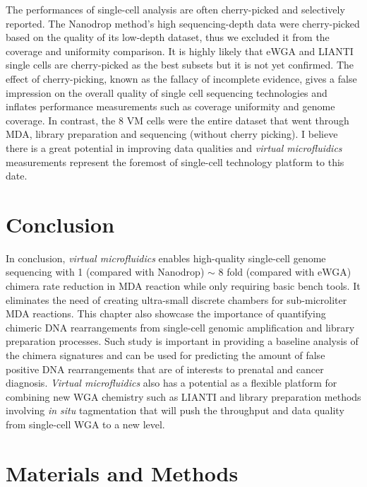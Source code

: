 The performances of single-cell analysis are often cherry-picked and selectively reported. The Nanodrop method's high sequencing-depth data were cherry-picked based on the quality of its low-depth dataset, thus we excluded it from the coverage and uniformity comparison. It is highly likely that eWGA and LIANTI single cells are cherry-picked as the best subsets but it is not yet confirmed. The effect of cherry-picking, known as the fallacy of incomplete evidence, gives a false impression on the overall quality of single cell sequencing technologies and inflates performance measurements such as coverage uniformity and genome coverage. In contrast, the 8 VM cells were the entire dataset that went through MDA, library preparation and sequencing (without cherry picking). I believe there is a great potential in improving data qualities and \textit{virtual microfluidics} measurements represent the foremost of single-cell technology platform to this date. 

\section{Conclusion}
In conclusion, \textit{virtual microfluidics} enables high-quality single-cell genome sequencing with 1 (compared with Nanodrop) $\sim$ 8 fold (compared with eWGA) chimera rate reduction in MDA reaction while only requiring basic bench tools. It eliminates the need of creating ultra-small discrete chambers for sub-microliter MDA reactions. This chapter also showcase the importance of quantifying chimeric DNA rearrangements from single-cell genomic amplification and library preparation processes. Such study is important in providing a baseline analysis of the chimera signatures and can be used for predicting the amount of false positive DNA rearrangements that are of interests to prenatal and cancer diagnosis. \textit{Virtual microfluidics} also has a potential as a flexible platform for combining new WGA chemistry such as LIANTI and library preparation methods involving \textit{in situ} tagmentation that will push the throughput and data quality from single-cell WGA to a new level. 

\section{Materials and Methods}
